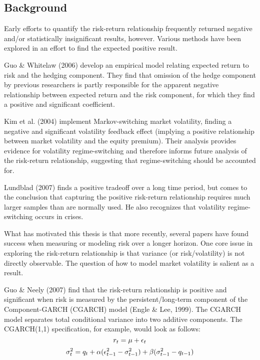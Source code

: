 \documentclass[12pt]{article}
\begin{document}
\subsection{Background}
Early efforts to quantify the risk-return relationship frequently returned negative and/or statistically insignificant results, however. Various methods have been explored in an effort to find the expected positive result.\par
Guo \& Whitelaw (2006) develop an empirical model relating expected return to risk and the hedging component. They find that omission of the hedge component by previous researchers is partly responsible for the apparent negative relationship between expected return and the risk component, for which they find a positive 
and significant coefficient.\par
Kim et al. (2004) implement Markov-switching market volatility, finding a negative and significant volatility feedback effect (implying a positive relationship between market volatility and the equity premium). Their analysis provides evidence for volatility regime-switching and therefore informs future analysis of the risk-return relationship, suggesting that regime-switching should be accounted for.\par
Lundblad (2007) finds a positive tradeoff over a long time period, but comes to the conclusion that capturing the positive risk-return relationship requires much larger samples than are normally used. He also recognizes that volatility regime-switching occurs in crises.\par
What has motivated this thesis is that more recently, several papers have found success when measuring or modeling risk over a longer horizon. One core issue in exploring the risk-return relationship is that variance (or risk/volatility) is not directly observable. The question of how to model market volatility is salient as a result.\par
Guo \& Neely (2007) find that the risk-return relationship is positive and significant when risk is measured by the persistent/long-term component of the Component-GARCH (CGARCH) model (Engle \& Lee, 1999). The CGARCH model separates total conditional variance into two additive components. The CGARCH(1,1) specification, for example, would look as follows:
\begin{equation}
\nonumber
r_t=\mu+\epsilon_t\\
\end{equation}
\begin{equation}
\nonumber
\sigma_t^2=q_t+\alpha(\epsilon_{t-1}^2-\sigma_{t-1}^2)+\beta(\sigma_{t-1}^2-q_{t-1})\\
\end{equation}
\end{document}
